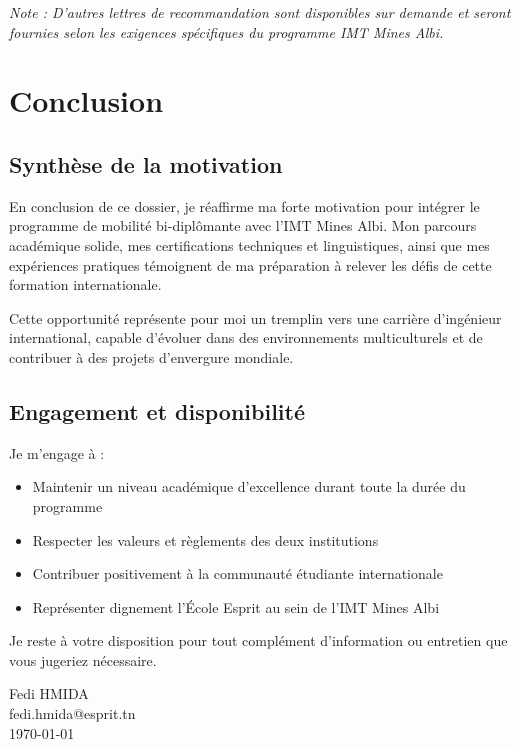 \documentclass[12pt,a4paper]{report}
\makeatletter
\newcommand{\candidatename}{Fedi HMIDA}
\newcommand{\candidateemail}{fedi.hmida@esprit.tn}
\newcommand{\submissiondate}{\today}
\makeatother
\begin{document}
\textit{Note : D'autres lettres de recommandation sont disponibles sur demande et seront fournies selon les exigences spécifiques du programme IMT Mines Albi.}



\chapter{Conclusion}

\section{Synthèse de la motivation}

En conclusion de ce dossier, je réaffirme ma forte motivation pour intégrer le programme de mobilité bi-diplômante avec l'IMT Mines Albi. Mon parcours académique solide, mes certifications techniques et linguistiques, ainsi que mes expériences pratiques témoignent de ma préparation à relever les défis de cette formation internationale.

Cette opportunité représente pour moi un tremplin vers une carrière d'ingénieur international, capable d'évoluer dans des environnements multiculturels et de contribuer à des projets d'envergure mondiale.

\section{Engagement et disponibilité}

Je m'engage à :
\begin{itemize}
    \item Maintenir un niveau académique d'excellence durant toute la durée du programme
    \item Respecter les valeurs et règlements des deux institutions
    \item Contribuer positivement à la communauté étudiante internationale
    \item Représenter dignement l'École Esprit au sein de l'IMT Mines Albi
\end{itemize}

Je reste à votre disposition pour tout complément d'information ou entretien que vous jugeriez nécessaire.

\vspace{2cm}

\begin{flushright}
\candidatename\\
\candidateemail\\
\submissiondate
\end{flushright}
\end{document}

